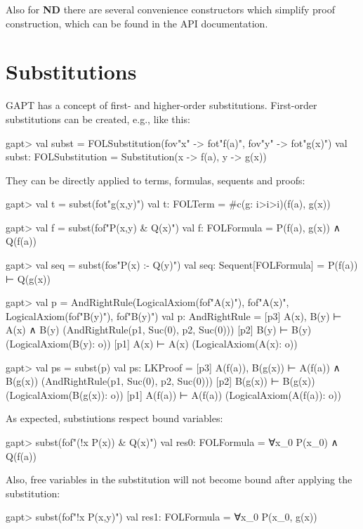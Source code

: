\documentclass[a4paper,11pt]{book}
\newcommand{\ND}{\textbf{ND}}
\begin{document}
Also for {\ND} there are several convenience constructors which simplify proof
construction, which can be found in the API documentation.

\section{Substitutions}

GAPT has a concept of first- and higher-order substitutions.
First-order substitutions can be created, e.g., like this:
\begin{clilisting}
gapt> val subst = FOLSubstitution(fov"x" -> fot"f(a)", fov"y" -> fot"g(x)")
val subst: FOLSubstitution = Substitution(x -> f(a), y -> g(x))

\end{clilisting}

They can be directly applied to terms, formulas, sequents and proofs:
\begin{clilisting}
gapt> val t = subst(fot"g(x,y)")
val t: FOLTerm = #c(g: i>i>i)(f(a), g(x))

gapt> val f = subst(fof"P(x,y) & Q(x)")
val f: FOLFormula = P(f(a), g(x)) ∧ Q(f(a))

gapt> val seq = subst(fos"P(x) :- Q(y)")
val seq: Sequent[FOLFormula] = P(f(a)) ⊢ Q(g(x))

gapt> val p = AndRightRule(LogicalAxiom(fof"A(x)"), fof"A(x)", LogicalAxiom(fof"B(y)"), fof"B(y)")
val p: AndRightRule = [p3] A(x), B(y) ⊢ A(x) ∧ B(y)    (AndRightRule(p1, Suc(0), p2, Suc(0)))
[p2] B(y) ⊢ B(y)    (LogicalAxiom(B(y): o))
[p1] A(x) ⊢ A(x)    (LogicalAxiom(A(x): o))

gapt> val ps = subst(p)
val ps: LKProof = [p3] A(f(a)), B(g(x)) ⊢ A(f(a)) ∧ B(g(x))    (AndRightRule(p1, Suc(0), p2, Suc(0)))
[p2] B(g(x)) ⊢ B(g(x))    (LogicalAxiom(B(g(x)): o))
[p1] A(f(a)) ⊢ A(f(a))    (LogicalAxiom(A(f(a)): o))

\end{clilisting}

As expected, substiutions respect bound variables:
\begin{clilisting}
gapt> subst(fof"(!x P(x)) & Q(x)")
val res0: FOLFormula = ∀x_0 P(x_0) ∧ Q(f(a))

\end{clilisting}

Also, free variables in the substitution will not become bound after applying the substitution:
\begin{clilisting}
gapt> subst(fof"!x P(x,y)")
val res1: FOLFormula = ∀x_0 P(x_0, g(x))

\end{clilisting}
\end{document}
